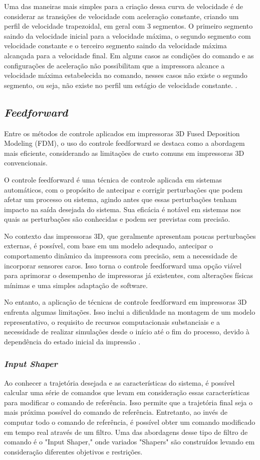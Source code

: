 Uma das maneiras mais simples para a criação dessa curva de velocidade é
de considerar as transições de velocidade com aceleração constante, criando 
um perfil de velocidade trapezoidal, em geral com 3 segmentos.
O primeiro segmento saindo da velocidade inicial para a velocidade máxima,
o segundo segmento com velocidade constante e o terceiro segmento saindo da velocidade máxima alcançada
para a velocidade final.
Em alguns casos as condições do comando e as configurações de aceleração não possibilitam que a impressora
alcance a velocidade máxima estabelecida no comando, nesses casos não existe o segundo segmento, ou seja, não existe
no perfil um estágio de velocidade constante.
\cite{yu20,klipperkinematic}.

\subsection{\textit{Feedforward}}
Entre os métodos de controle aplicados em impressoras 3D Fused Deposition Modeling (FDM), o uso do controle feedforward se destaca como a abordagem mais eficiente, considerando as limitações de custo comuns em impressoras 3D convencionais.

O controle feedforward é uma técnica de controle aplicada em sistemas automáticos, com o propósito de antecipar e corrigir perturbações que podem afetar um processo ou sistema, agindo antes que essas perturbações tenham impacto na saída desejada do sistema. Sua eficácia é notável em sistemas nos quais as perturbações são conhecidas e podem ser previstas com precisão.

No contexto das impressoras 3D, que geralmente apresentam poucas perturbações externas, é possível, com base em um modelo adequado, antecipar o comportamento dinâmico da impressora com precisão, sem a necessidade de incorporar sensores caros. Isso torna o controle feedforward uma opção viável para aprimorar o desempenho de impressoras já existentes, com alterações físicas mínimas e uma simples adaptação de software.

No entanto, a aplicação de técnicas de controle feedforward em impressoras 3D enfrenta algumas limitações. Isso inclui a dificuldade na montagem de um modelo representativo, o requisito de recursos computacionais substanciais e a necessidade de realizar simulações desde o início até o fim do processo, devido à dependência do estado inicial da impressão \cite{ramani20,duan18}.

\subsubsection{\textit{Input Shaper}}
Ao conhecer a trajetória desejada e as características do sistema, é possível calcular uma série de comandos que levam em consideração essas características para modificar o comando de referência. Isso permite que a trajetória final seja o mais próxima possível do comando de referência. Entretanto, ao invés de computar todo o comando de referência, é possível obter um comando modificado em tempo real através de um filtro. Uma das abordagens desse tipo de filtro de comando é o "Input Shaper," onde variados "Shapers" são construídos levando em consideração diferentes objetivos e restrições.

